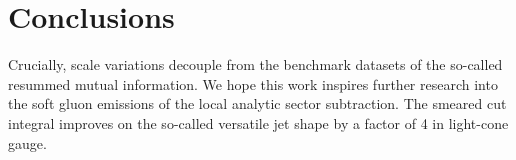\section{Conclusions}\label{sec:conclusions}

Crucially, scale variations decouple from the benchmark datasets of the
so-called resummed mutual information. We hope this work inspires
further research into the soft gluon emissions of the local analytic
sector subtraction. The smeared cut integral improves on the so-called
versatile jet shape by a factor of 4 in light-cone gauge.

